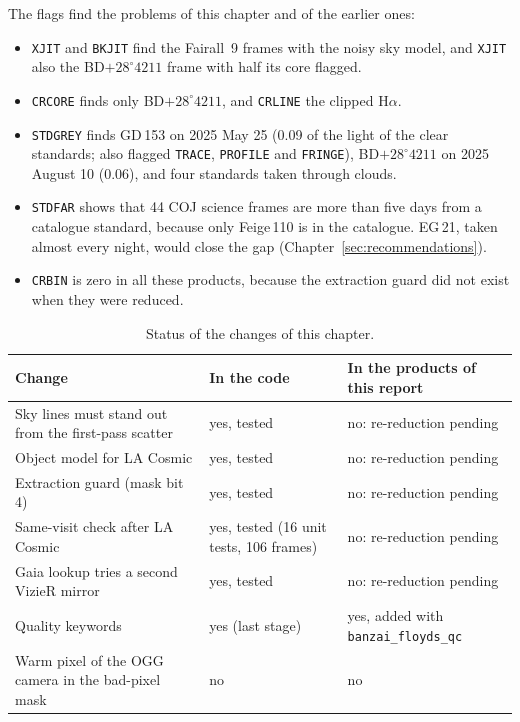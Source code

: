 The flags find the problems of this chapter and of the earlier ones:
\begin{itemize}
\item \texttt{XJIT} and \texttt{BKJIT} find the Fairall~9 frames with the noisy sky model, and \texttt{XJIT} also the
BD$+28^\circ4211$ frame with half its core flagged.
\item \texttt{CRCORE} finds only BD$+28^\circ4211$, and \texttt{CRLINE} the clipped H$\alpha$.
\item \texttt{STDGREY} finds GD\,153 on 2025 May 25 (0.09 of the light of the clear standards; also flagged
\texttt{TRACE}, \texttt{PROFILE} and \texttt{FRINGE}), BD$+28^\circ4211$ on 2025 August 10 (0.06), and four standards
taken through clouds.
\item \texttt{STDFAR} shows that 44 COJ science frames are more than five days from a catalogue standard, because only
Feige\,110 is in the catalogue. EG\,21, taken almost every night, would close the gap
(Chapter~\ref{sec:recommendations}).
\item \texttt{CRBIN} is zero in all these products, because the extraction guard did not exist when they were reduced.
\end{itemize}

\begin{table}[!htbp]
\centering
\caption{Status of the changes of this chapter.}
\label{tab:cr_status}
\small
\begin{tabular}{@{}p{5.2cm}p{3.6cm}p{5.6cm}@{}}
\toprule
Change & In the code & In the products of this report \\
\midrule
Sky lines must stand out from the first-pass scatter & yes, tested & no: re-reduction pending \\
Object model for LA Cosmic & yes, tested & no: re-reduction pending \\
Extraction guard (mask bit 4) & yes, tested & no: re-reduction pending \\
Same-visit check after LA Cosmic & yes, tested (16 unit tests, 106 frames) & no: re-reduction pending \\
Gaia lookup tries a second VizieR mirror & yes, tested & no: re-reduction pending \\
Quality keywords & yes (last stage) & yes, added with \texttt{banzai\_floyds\_qc} \\
Warm pixel of the OGG camera in the bad-pixel mask & no & no \\
\bottomrule
\end{tabular}
\end{table}

